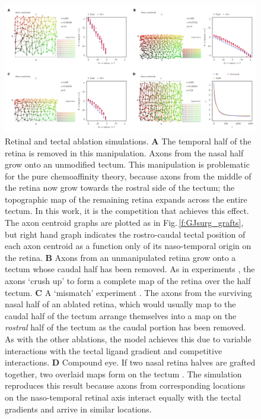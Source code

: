 \documentclass[9pt,lineno]{elife}
\begin{document}
\begin{figure}
\begin{fullwidth}
\includegraphics[width=0.95\linewidth]{./images/fig_GJ_surgical_ablations.png}
\caption{Retinal and tectal ablation simulations. \textbf{A} The temporal half of the retina is removed in this manipulation. Axons from the nasal half grow onto an unmodified tectum. This manipulation is problematic for the pure chemoaffinity theory, because axons from the middle of the retina now grow towards the rostral side of the tectum; the topographic map of the remaining retina expands across the entire tectum. In this work, it is the competition that achieves this effect. The axon centroid graphs are plotted as in Fig.\,\ref{f:GJsurg_grafts}, but right hand graph indicates the rostro-caudal tectal position of each axon centroid as a function only of its naso-temporal origin on the retina. \textbf{B} Axons from an unmanipulated retina grow onto a tectum whose caudal half has been removed. As in experiments \citep{yoon_reorganization_1971,finlay_orderly_1979}, the axons `crush up' to form a complete map of the retina over the half tectum. \textbf{C} A `mismatch' experiment \citep{horder_retention_1971}. The axons from the surviving nasal half of an ablated retina, which would usually map to the caudal half of the tectum arrange themselves into a map on the \emph{rostral} half of the tectum as the caudal portion has been removed. As with the other ablations, the model achieves this due to variable interactions with the tectal ligand gradient and competitive interactions. \textbf{D} Compound eye. If two nasal retina halves are grafted together, two overlaid maps form on the tectum \citep{gaze_retino-tectal_1963}. The simulation reproduces this result because axons from corresponding locations on the naso-temporal retinal axis interact equally with the tectal gradients and arrive in similar locations.}
\label{f:GJsurg_ablate}
\end{fullwidth}
\end{figure}
\end{document}
